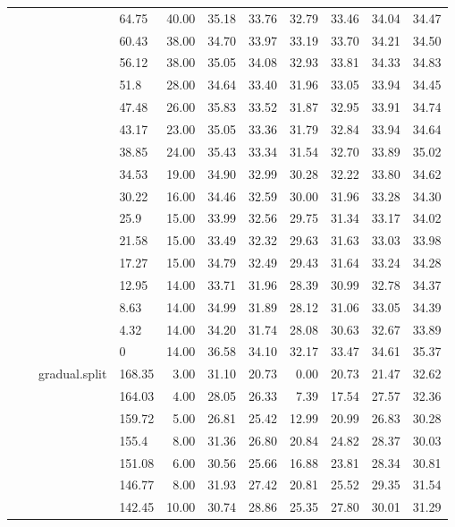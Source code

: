 \begin{longtable}{llllrrrrrrr}
   &  &  & 64.75 & 40.00 & 35.18 & 33.76 & 32.79 & 33.46 & 34.04 & 34.47 \\ 
   &  &  & 60.43 & 38.00 & 34.70 & 33.97 & 33.19 & 33.70 & 34.21 & 34.50 \\ 
   &  &  & 56.12 & 38.00 & 35.05 & 34.08 & 32.93 & 33.81 & 34.33 & 34.83 \\ 
   &  &  & 51.8 & 28.00 & 34.64 & 33.40 & 31.96 & 33.05 & 33.94 & 34.45 \\ 
   &  &  & 47.48 & 26.00 & 35.83 & 33.52 & 31.87 & 32.95 & 33.91 & 34.74 \\ 
   &  &  & 43.17 & 23.00 & 35.05 & 33.36 & 31.79 & 32.84 & 33.94 & 34.64 \\ 
   &  &  & 38.85 & 24.00 & 35.43 & 33.34 & 31.54 & 32.70 & 33.89 & 35.02 \\ 
   &  &  & 34.53 & 19.00 & 34.90 & 32.99 & 30.28 & 32.22 & 33.80 & 34.62 \\ 
   &  &  & 30.22 & 16.00 & 34.46 & 32.59 & 30.00 & 31.96 & 33.28 & 34.30 \\ 
   &  &  & 25.9 & 15.00 & 33.99 & 32.56 & 29.75 & 31.34 & 33.17 & 34.02 \\ 
   &  &  & 21.58 & 15.00 & 33.49 & 32.32 & 29.63 & 31.63 & 33.03 & 33.98 \\ 
   &  &  & 17.27 & 15.00 & 34.79 & 32.49 & 29.43 & 31.64 & 33.24 & 34.28 \\ 
   &  &  & 12.95 & 14.00 & 33.71 & 31.96 & 28.39 & 30.99 & 32.78 & 34.37 \\ 
   &  &  & 8.63 & 14.00 & 34.99 & 31.89 & 28.12 & 31.06 & 33.05 & 34.39 \\ 
   &  &  & 4.32 & 14.00 & 34.20 & 31.74 & 28.08 & 30.63 & 32.67 & 33.89 \\ 
   &  &  & 0 & 14.00 & 36.58 & 34.10 & 32.17 & 33.47 & 34.61 & 35.37 \\ 
   &  & gradual.split & 168.35 & 3.00 & 31.10 & 20.73 & 0.00 & 20.73 & 21.47 & 32.62 \\ 
   &  &  & 164.03 & 4.00 & 28.05 & 26.33 & 7.39 & 17.54 & 27.57 & 32.36 \\ 
   &  &  & 159.72 & 5.00 & 26.81 & 25.42 & 12.99 & 20.99 & 26.83 & 30.28 \\ 
   &  &  & 155.4 & 8.00 & 31.36 & 26.80 & 20.84 & 24.82 & 28.37 & 30.03 \\ 
   &  &  & 151.08 & 6.00 & 30.56 & 25.66 & 16.88 & 23.81 & 28.34 & 30.81 \\ 
   &  &  & 146.77 & 8.00 & 31.93 & 27.42 & 20.81 & 25.52 & 29.35 & 31.54 \\ 
   &  &  & 142.45 & 10.00 & 30.74 & 28.86 & 25.35 & 27.80 & 30.01 & 31.29 \\ 

\end{longtable}
